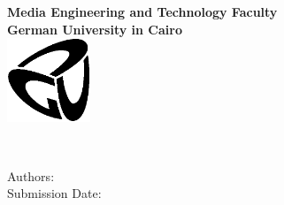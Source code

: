 \newcommand{\titlePage}{

\thispagestyle{empty}
\begin{center}
	\textbf{Media Engineering and Technology Faculty}\\[1mm]
	\textbf{German University in Cairo}\\[1mm]
	\includegraphics[width=2.5cm]{assets/images/GUC-logo-ss.eps}

	\vspace{2cm}
	\doublespacing
	{\Huge \textbf{\reportTitle}}\\
	\singlespacing
	\vspace{2cm}

		Authors:
		\authors\\[5mm]
		Submission Date:
		\submissionDate

\end{center}
\clearpage
}

\titlePage
